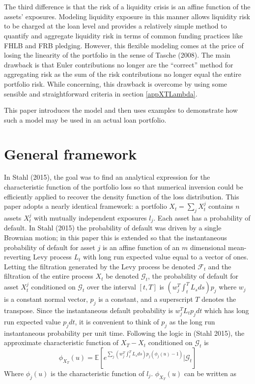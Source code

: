 \documentclass[12pt]{article}
\theoremstyle{definition}
\begin{document}
\\
\\
The third difference is that the risk of a liquidity crisis is an affine function of the assets' exposures.  Modeling liquidity exposure in this manner allows liquidity risk to be charged at the loan level and provides a relatively simple method to quantify and aggregate liquidity risk in terms of common funding practices like FHLB and FRB pledging.  However, this flexible modeling comes at the price of losing the linearity of the portfolio in the sense of Tasche (2008).  The main drawback is that Euler contributions no longer are the ``correct'' method for aggregating risk as the sum of the risk contributions no longer equal the entire portfolio risk.  While concerning, this drawback is overcome by using some sensible and straightforward criteria in section \ref{appXTLambda}.

This paper introduces the model and then uses examples to demonstrate how such a model may be used in an actual loan portfolio.  
\section{General framework}
In Stahl (2015), the goal was to find an analytical expression for the characteristic function of the portfolio loss so that numerical inversion could be efficiently applied to recover the density function of the loss distribution.  This paper adopts a nearly identical framework: a portfolio \(X_t=\sum_j X_t ^ j\) contains \(n\) assets \(X_t ^ j\) with mutually independent exposures \(l_j\).  Each asset has a probability of default.  In Stahl (2015) the probability of default was driven by a single Brownian motion; in this paper this is extended so that the instantaneous probability of default for asset \(j\) is an affine function of an \(m\) dimensional mean-reverting Levy process \(L_t\) with long run expected value equal to a vector of ones.  Letting the filtration generated by the Levy process be denoted \(\mathcal{F}_t\) and the filtration of the entire process \(X_t\) be denoted \(\mathcal{G}_t\), the probability of default for asset \(X_t ^ j\) conditioned on \(\mathcal{G}_t\) over the interval \([t, T]\) is \(\left(w_j ^ T \int_t ^ T L_s ds  \right) p_j\) where \(w_j\) is a constant normal vector, \(p_j\) is a constant, and a superscript \(T\) denotes the transpose.  Since the instantaneous default probability is \(w_j ^T L_t p_j dt\) which has long run expected value \(p_j dt\),  it is convenient to think of \(p_j\) as the long run instantaneous probability per unit time.  Following the logic in (Stahl 2015), the approximate characteristic function of \(X_T-X_t\) conditioned on \(\mathcal{G}_t\) is 
\begin{equation}
\phi_{X_T}(u)=\mathbb{E}\left[e^{\sum_j \left(w_j ^T \int_t ^ T L_s  ds \right) p_j (\phi_j(u)-1)} |\mathcal{G}_t\right]
\end{equation}
Where \(\phi_j(u)\) is the characteristic function of \(l_j\).  \(\phi_{X_T}(u)\) can be written as 
\end{document}
